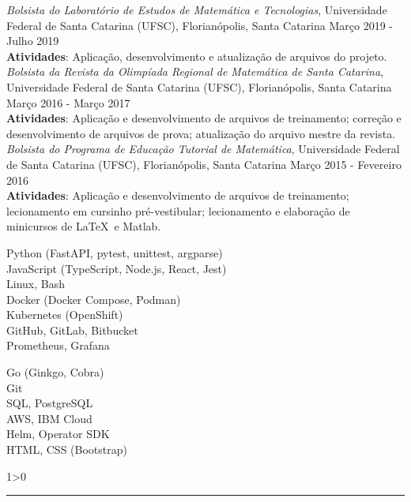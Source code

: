 \documentclass[a4paper,10pt]{article}
\newcommand{\criaSecao}[4][0]{
	\begin{tcolorbox}[
        blanker,
        breakable,
        title=\begin{minipage}{0.16\linewidth}\large{\textbf{#2}}\vspace{-#3\baselineskip}\end{minipage},
        coltitle=black,
        leftupper=0.21\linewidth,
    ]
        #4
		\ifnum0#1>0 { \hrule {\ } } \fi
    \end{tcolorbox}
}
\begin{document}
{		\textit{Bolsista do Laboratório de Estudos de Matemática e Tecnologias}, Universidade Federal de Santa Catarina (UFSC), Florianópolis, Santa Catarina \hfill Março 2019 - Julho 2019 \\
		\textbf{Atividades}: Aplicação, desenvolvimento e atualização de arquivos do projeto.\\

		\textit{Bolsista da Revista da Olimpíada Regional de Matemática de Santa Catarina}, Universidade Federal de Santa Catarina (UFSC), Florianópolis, Santa Catarina \hfill Março 2016 - Março 2017 \\
		\textbf{Atividades}: Aplicação e desenvolvimento de arquivos de treinamento; correção e desenvolvimento de arquivos de prova; atualização do arquivo mestre da revista.\\

		\textit{Bolsista do Programa de Educação Tutorial de Matemática}, Universidade Federal de Santa Catarina (UFSC), Florianópolis, Santa Catarina \hfill Março 2015 - Fevereiro 2016 \\
		\textbf{Atividades}: Aplicação e desenvolvimento de arquivos de treinamento; lecionamento em cursinho pré-vestibular; lecionamento e elaboração de minicursos de \LaTeX\ e Matlab. \\
    }

    \criaSecao[1]{Linguagens de programação e ferramentas}{4}{
        \large{\bf
			\begin{minipage}{0.65\linewidth}
				Python (FastAPI, pytest, unittest, argparse)\\
				JavaScript (TypeScript, Node.js, React, Jest)\\
				Linux, Bash\\
				Docker (Docker Compose, Podman)\\
				Kubernetes (OpenShift)\\
				GitHub, GitLab, Bitbucket\\
				Prometheus, Grafana\\
			\end{minipage}
			\begin{minipage}{0.35\linewidth}
				Go (Ginkgo, Cobra)\\
				Git\\
				SQL, PostgreSQL\\
				AWS, IBM Cloud\\
				Helm, Operator SDK\\
				HTML, CSS (Bootstrap)\\
				\vspace{\baselineskip}
			\end{minipage}
		}
    }
\end{document}
